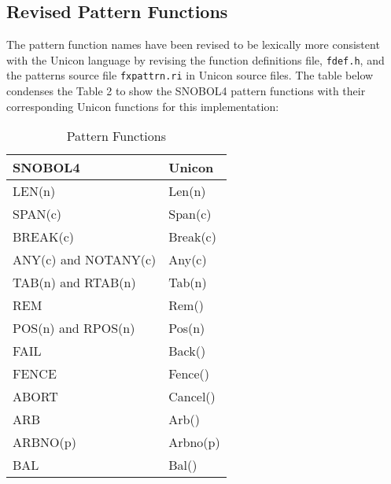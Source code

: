 \documentclass{article}
\begin{document}
\subsection{Revised Pattern Functions}
The pattern function names have been revised to be lexically more consistent with the Unicon language by revising the function definitions file, \texttt{fdef.h}, and the patterns source file \texttt{fxpattrn.ri} in Unicon source files.  The table below condenses the Table 2 to show the SNOBOL4 pattern functions with their corresponding Unicon functions for this implementation:  

\begin{table}[ht]
		\caption{Pattern Functions}
		\centering
		
		\begin{tabular}{|l|l|}
			\hline\hline
			SNOBOL4 & Unicon \\
			\hline
			LEN(n) & Len(n) \\
			SPAN(c) & Span(c)  \\
			BREAK(c) & Break(c) \\
			ANY(c) and NOTANY(c) & Any(c) \\
			TAB(n) and RTAB(n) & Tab(n) \\
			REM & Rem() \\
			POS(n) and RPOS(n) & Pos(n) \\
			FAIL & Back() \\
			FENCE & Fence() \\
			ABORT & Cancel() \\
			ARB & Arb() \\
			ARBNO(p) & Arbno(p) \\
			BAL & Bal() \\
			\hline
		\end{tabular}

\end{table}
\end{document}
